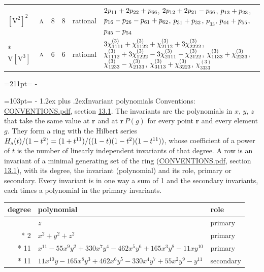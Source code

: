 \documentclass[10pt,a4paper]{article}
\makeatletter
\renewcommand\section{\@startsection{section}{1}{\z@}{-3ex plus -1ex minus -.2ex}%
  {1.2ex plus .2ex}{\normalfont\large\sffamily\bfseries\color{parttitle}}}
\newcommand{\needspace}[1]{\par\penalty-100\begingroup\dimen0=#1\relax\dimen2=\pagegoal
  \advance\dimen2-\pagetotal\ifdim\dimen0>\dimen2\relax\ifdim\dimen2>0pt\vfil\break\fi\fi
  \endgroup}
\numberwithin{equation}{section}
\newcommand{\irr}[1]{\text{\normalfont\scshape #1}}
\newcommand{\pointr}{\mathbf{r}}
\newcommand{\jahn}[1]{\mathrm{#1}}
\newlength{\fillwidth}\newlength{\cellwidth}\newlength{\colwidth}
\newcommand{\signbreak}{\penalty100\relax}
\makeatother
\begin{document}
{\begin{longtable}{@{}llrrl>{\RaggedRight\arraybackslash}p{\fillwidth}@{}}
$\jahn{[V^{2}]^{2}}$ & $\irr{a}$ & 8 & 8 & rational & $2p_{11} +\signbreak 2p_{22} +\signbreak p_{66}$, $2p_{12} +\signbreak 2p_{21} -\signbreak p_{66}$, $p_{13} +\signbreak p_{23}$, $p_{16} -\signbreak p_{26} -\signbreak p_{61} +\signbreak p_{62}$, $p_{31} +\signbreak p_{32}$, $p_{33}$, $p_{44} +\signbreak p_{55}$, $p_{45} -\signbreak p_{54}$\\*
$\jahn{V[V^{3}]}$ & $\irr{a}$ & 6 & 6 & rational & $3\chi^{(3)}_{1111} +\signbreak \chi^{(3)}_{1122} +\signbreak \chi^{(3)}_{2112} +\signbreak 3\chi^{(3)}_{2222}$, $\chi^{(3)}_{1112} +\signbreak 3\chi^{(3)}_{1222} -\signbreak 3\chi^{(3)}_{2111} -\signbreak \chi^{(3)}_{2122}$, $\chi^{(3)}_{1133} +\signbreak \chi^{(3)}_{2233}$, $\chi^{(3)}_{1233} -\signbreak \chi^{(3)}_{2133}$, $\chi^{(3)}_{3113} +\signbreak \chi^{(3)}_{3223}$, $\chi^{(3)}_{3333}$\\
\bottomrule\end{longtable}}
\needspace{211pt}
\needspace{103pt}
\section{Invariant polynomials}\label{s:invariant_polynomials}
Conventions: \href{../../CONVENTIONS.pdf}{CONVENTIONS.pdf}, section \href{../../CONVENTIONS.pdf\#conv.13.1}{13.1}.
The invariants are the polynomials in $x$, $y$, $z$ that take the same value at $\pointr$ and at $\pointr\,P(g)$ for every point $\pointr$ and every element $g$. They form a ring with the Hilbert series $H_{\irr{a}}(t)/(1-t^{2}) = (1 + t^{11})/((1-t)(1-t^{2})(1-t^{11}))$, whose coefficient of a power of $t$ is the number of linearly independent invariants of that degree. \label{n:head.degree}\label{n:head.role}A row is an invariant of a minimal generating set of the ring (\href{../../CONVENTIONS.pdf}{CONVENTIONS.pdf}, section \href{../../CONVENTIONS.pdf\#conv.13.1}{13.1}), with its degree, the invariant (polynomial) and its role, primary or secondary. Every invariant is in one way a sum of 1 and the secondary invariants, each times a polynomial in the primary invariants.
{\small\begin{longtable}{@{}rll@{}}\toprule
degree & polynomial & role\\\midrule\endhead
\bottomrule\endfoot\endlastfoot
1 & $z$ & primary\\*
2 & $x^{2} + y^{2} + z^{2}$ & primary\\*
11 & $x^{11} - 55x^{9}y^{2} + 330x^{7}y^{4} - 462x^{5}y^{6} + 165x^{3}y^{8} - 11xy^{10}$ & primary\\*
11 & $11x^{10}y - 165x^{8}y^{3} + 462x^{6}y^{5} - 330x^{4}y^{7} + 55x^{2}y^{9} - y^{11}$ & secondary\\
\bottomrule\end{longtable}}
\end{document}
